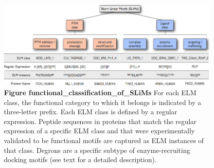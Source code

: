 \begin{figure}[h!]
\centering
\includegraphics[width=\textwidth]{Figures/functional_classification_of_SLiMs.png}
\caption{
\textbf{Figure functional\_classification\_of\_SLiMs}
For each ELM
class, the functional category to which it belongs is indicated by a
three-letter prefix. Each ELM class is defined by a regular expression.
Peptide sequences in proteins that match the regular expression of a
specific ELM class and that were experimentally validated to be
functional motifs are captured as ELM instances of that class. Degrons
are a specific subtype of enzyme-recruiting docking motifs (see text for
a detailed description).
}
\end{figure}
